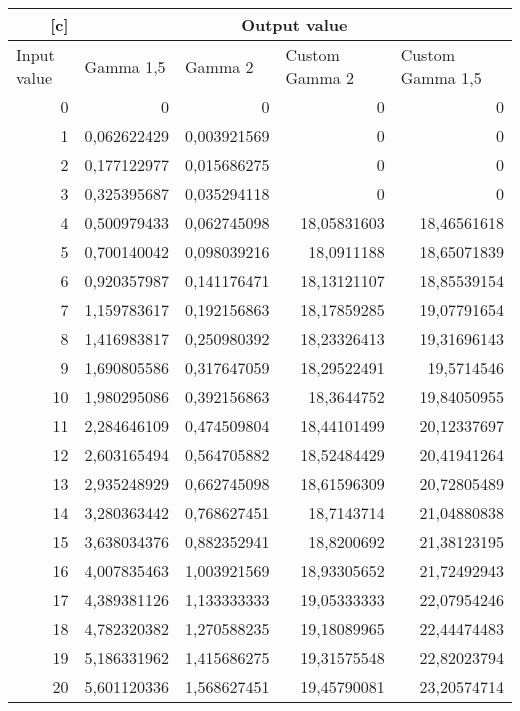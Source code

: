 

\begin{longtable}{r|rrrr}[c]
        & \multicolumn{4}{c|}{Output value} \\
    \hline
    \multicolumn{1}{|l|}{Input value} & \multicolumn{1}{l|}{Gamma 1,5} & \multicolumn{1}{l|}{Gamma 2} & \multicolumn{1}{l|}{Custom Gamma 2} & \multicolumn{1}{l|}{Custom Gamma 1,5} \\
    \hline
    0     & 0     & 0     & 0     & 0 \\
    1     & 0,062622429 & 0,003921569 & 0     & 0 \\
    2     & 0,177122977 & 0,015686275 & 0     & 0 \\
    3     & 0,325395687 & 0,035294118 & 0     & 0 \\
    4     & 0,500979433 & 0,062745098 & 18,05831603 & 18,46561618 \\
    5     & 0,700140042 & 0,098039216 & 18,0911188 & 18,65071839 \\
    6     & 0,920357987 & 0,141176471 & 18,13121107 & 18,85539154 \\
    7     & 1,159783617 & 0,192156863 & 18,17859285 & 19,07791654 \\
    8     & 1,416983817 & 0,250980392 & 18,23326413 & 19,31696143 \\
    9     & 1,690805586 & 0,317647059 & 18,29522491 & 19,5714546 \\
    10    & 1,980295086 & 0,392156863 & 18,3644752 & 19,84050955 \\
    11    & 2,284646109 & 0,474509804 & 18,44101499 & 20,12337697 \\
    12    & 2,603165494 & 0,564705882 & 18,52484429 & 20,41941264 \\
    13    & 2,935248929 & 0,662745098 & 18,61596309 & 20,72805489 \\
    14    & 3,280363442 & 0,768627451 & 18,7143714 & 21,04880838 \\
    15    & 3,638034376 & 0,882352941 & 18,8200692 & 21,38123195 \\
    16    & 4,007835463 & 1,003921569 & 18,93305652 & 21,72492943 \\
    17    & 4,389381126 & 1,133333333 & 19,05333333 & 22,07954246 \\
    18    & 4,782320382 & 1,270588235 & 19,18089965 & 22,44474483 \\
    19    & 5,186331962 & 1,415686275 & 19,31575548 & 22,82023794 \\
    20    & 5,601120336 & 1,568627451 & 19,45790081 & 23,20574714 \\

\end{longtable}

